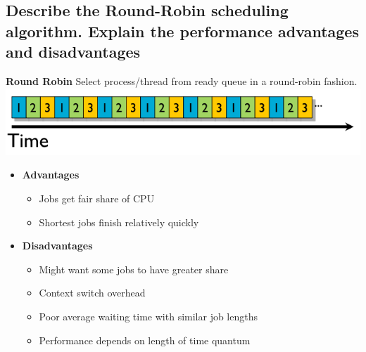 \documentclass[a4paper]{article}
\begin{document}
\subsection{Describe the Round-Robin scheduling algorithm. Explain the performance advantages and disadvantages} %
\label{sub:Describe the Round-Robin scheduling algorithm. Explain the performance advantages and disadvantages}
{\bf Round Robin} 
Select process/thread from ready queue in a round-robin fashion. \\
\includegraphics[scale=.45]{roundrobin.png}
\begin{itemize}
  \item {\bf Advantages}
    \begin{itemize}
      \item Jobs get fair share of CPU
      \item Shortest jobs finish relatively quickly
    \end{itemize}
  \item {\bf Disadvantages}
    \begin{itemize}
      \item Might want some jobs to have greater share
      \item Context switch overhead
      \item Poor average waiting time with similar job lengths
      \item Performance depends on length of time quantum
    \end{itemize}
\end{itemize}
\end{document}
